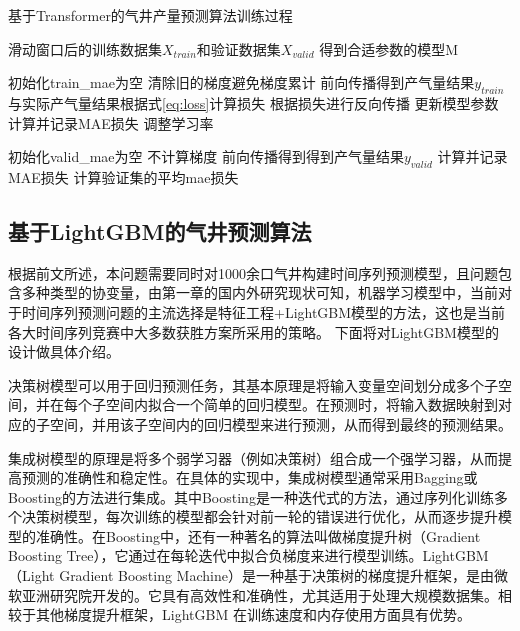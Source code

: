 \begin{algorithm}[H]
    \baselineskip=20pt
    \caption{基于Transformer的气井产量预测算法训练过程}
    \label{al:T-GRU}
    \begin{algorithmic}[1]
    \Require 滑动窗口后的训练数据集$X_{train}$和验证数据集$X_{valid}$
    \Ensure 得到合适参数的模型M

        \State 初始化train\_mae为空
            \State 清除旧的梯度避免梯度累计
            \State 前向传播得到产气量结果$y_{train}$
            \State 与实际产气量结果根据式\eqref{eq:loss}计算损失
            \State 根据损失进行反向传播
            \State 更新模型参数
        \EndFor    
        \State 计算并记录MAE损失
        \State 调整学习率

        \State 初始化valid\_mae为空
            \State 不计算梯度
            \State 前向传播得到得到产气量结果$y_{valid}$
            \State 计算并记录MAE损失
        \EndFor
        \State 计算验证集的平均mae损失
    \EndFor
    \end{algorithmic}
  \end{algorithm}
\subsection{基于LightGBM的气井预测算法}
根据前文所述，本问题需要同时对1000余口气井构建时间序列预测模型，且问题包含多种类型的协变量，由第一章的国内外研究现状可知，机器学习模型中，当前对于时间序列预测问题的主流选择是特征工程+LightGBM模型的方法，这也是当前各大时间序列竞赛中大多数获胜方案所采用的策略。
下面将对LightGBM模型的设计做具体介绍。

决策树模型可以用于回归预测任务，其基本原理是将输入变量空间划分成多个子空间，并在每个子空间内拟合一个简单的回归模型。在预测时，将输入数据映射到对应的子空间，并用该子空间内的回归模型来进行预测，从而得到最终的预测结果。

集成树模型的原理是将多个弱学习器（例如决策树）组合成一个强学习器，从而提高预测的准确性和稳定性。在具体的实现中，集成树模型通常采用Bagging或Boosting的方法进行集成。其中Boosting是一种迭代式的方法，通过序列化训练多个决策树模型，每次训练的模型都会针对前一轮的错误进行优化，从而逐步提升模型的准确性。在Boosting中，还有一种著名的算法叫做梯度提升树（Gradient Boosting Tree），它通过在每轮迭代中拟合负梯度来进行模型训练。LightGBM（Light Gradient Boosting Machine）是一种基于决策树的梯度提升框架，是由微软亚洲研究院开发的。它具有高效性和准确性，尤其适用于处理大规模数据集。相较于其他梯度提升框架，LightGBM 在训练速度和内存使用方面具有优势。

